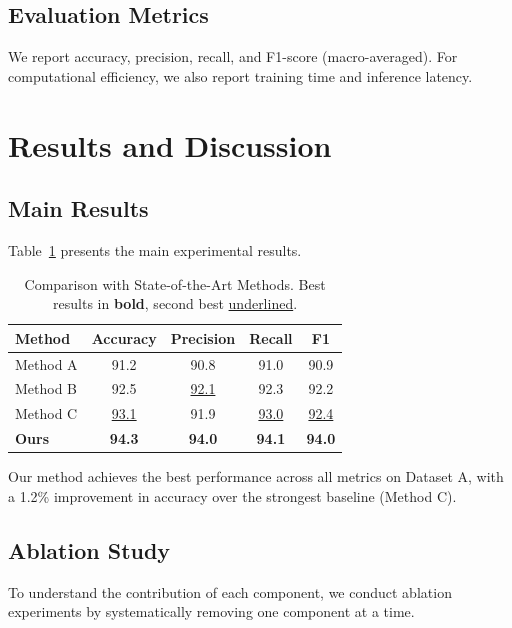 \documentclass[conference,10pt]{IEEEtran}
\begin{document}
\subsection{Evaluation Metrics}
We report accuracy, precision, recall, and F1-score (macro-averaged).
For computational efficiency, we also report training time and inference
latency.

\section{Results and Discussion}
\label{sec:results}

\subsection{Main Results}
\label{subsec:main_results}
Table~\ref{tab:results} presents the main experimental results.

\begin{table}[t]
    \centering
    \caption{Comparison with State-of-the-Art Methods. Best results
             in \textbf{bold}, second best \underline{underlined}.}
    \label{tab:results}
    \begin{tabular}{lcccc}
        \toprule
        \textbf{Method} & \textbf{Accuracy} & \textbf{Precision} & \textbf{Recall} & \textbf{F1} \\
        \midrule
        Method A & 91.2 & 90.8 & 91.0 & 90.9 \\
        Method B & 92.5 & \underline{92.1} & 92.3 & 92.2 \\
        Method C & \underline{93.1} & 91.9 & \underline{93.0} & \underline{92.4} \\
        \midrule
        \textbf{Ours} & \textbf{94.3} & \textbf{94.0} & \textbf{94.1} & \textbf{94.0} \\
        \bottomrule
    \end{tabular}
\end{table}

Our method achieves the best performance across all metrics on Dataset A,
with a 1.2\% improvement in accuracy over the strongest baseline
(Method C).

\subsection{Ablation Study}
\label{subsec:ablation}
To understand the contribution of each component, we conduct ablation
experiments by systematically removing one component at a time.
\end{document}
